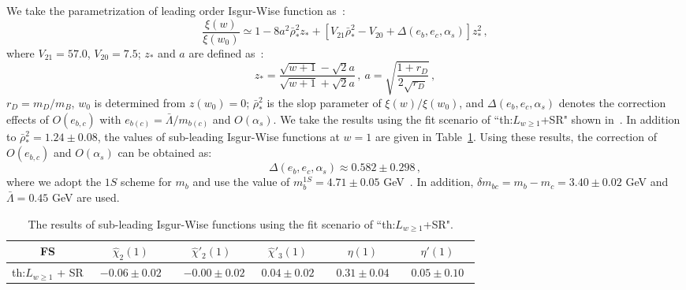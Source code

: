 \documentclass[prd,preprint,superscriptaddress,amsmath,amssymb]{revtex4}
\begin{document}
We take the parametrization of leading order Isgur-Wise function as~\cite{Bernlochner:2017jka,Caprini:1997mu}:
 \begin{equation}
 \frac{\xi(w)}{\xi(w_0)} \simeq  1 - 8 a^2 \bar\rho^2_{*}  z_{*} + \left[ V_{21} \bar\rho^2_{*} -V_{20} + \Delta(e_b,e_c,\alpha_s) \right] z^2_{*}\,,
 \end{equation}
 where $V_{21}=57.0$, $V_{20}=7.5$; $z_*$ and  $a$  are defined as~\cite{Caprini:1997mu}:
 \begin{equation}
 z_* = \frac{\sqrt{w+1} -\sqrt{2} a}{\sqrt{w+1} + \sqrt{2} a}\,, \ a = \sqrt{\frac{1+r_D}{2\sqrt{r_D} } }\,, 
 \end{equation}
 $r_D=m_D/m_B$, $w_0$ is determined from $z(w_0)=0$; $\bar \rho^2_{*}$ is the slop parameter of $\xi(w)/\xi(w_0)$, and $\Delta(e_b,e_c,\alpha_s)$ denotes the correction effects of $O(e_{b,c})$ with $e_{b(c)}=\bar\Lambda/m_{b(c)}$ and $O(\alpha_s)$. We take the results using  the fit scenario of ``th:$L_{w\geq 1}$+SR" shown in~\cite{Bernlochner:2017jka}. In addition to $\bar\rho^2_{*}=1.24\pm 0.08$, the values of sub-leading Isgur-Wise functions at $w=1$ are given in Table~\ref{tab:subIW}. Using these results, the correction of $O(e_{b,c})$ and $O(\alpha_s)$ can be obtained as:
  \begin{equation}
  \Delta(e_b,e_c,\alpha_s) \approx 0.582 \pm 0.298\,,
  \end{equation}
 where we adopt the $1S$ scheme for $m_b$ and use the value of $m^{1S}_{b}=4.71 \pm 0.05$ GeV~\cite{Bernlochner:2017jka}. In addition,  $\delta m_{bc}=m_b - m_c =3.40\pm 0.02$ GeV and $\bar \Lambda=0.45$ GeV are used. 
 
 \begin{table}[htbp]
   \caption{ The results of sub-leading Isgur-Wise functions using the fit scenario of ``th:$L_{w\geq  1}$+SR".}
  \label{tab:subIW}
   \begin{tabular}{c|ccccc} \hline \hline
   FS &  $\hat\chi_{2}(1)$ & $\hat\chi'_2(1)$ & $\hat\chi'_3(1)$ & $\eta(1)$ & $\eta'(1)$   \\ \hline 
   th:$L_{w\geq 1}$ + SR & ~$ -0.06 \pm 0.02$~  &  ~$-0.00\pm 0.02$ & ~$0.04 \pm 0.02$~ & ~$0.31\pm 0.04$~ & ~$0.05\pm 0.10$~  \\ \hline  \hline
   
     \end{tabular}
\end{table}
 
\end{document}
